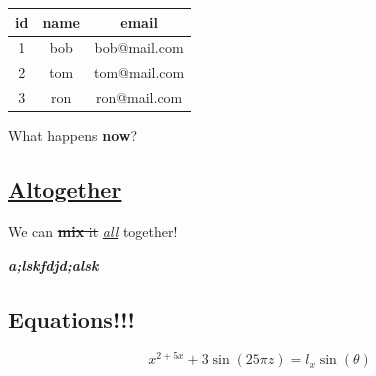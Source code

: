 \documentclass{article}
\begin{document}
\noindent
\begin{tabular}{| c | c | c |}
\hline 

id
&
name
&
email
\\
\hline 

1
&
bob
&
bob@mail.com
\\
\hline 

2
&
tom
&
tom@mail.com
\\
\hline 

3
&
ron
&
ron@mail.com
\\
\hline 
\end{tabular}


What happens \textbf{now}?

\subsection{\underline{Altogether}}

We can \sout{\textbf{mix} it}  \underline{\textit{all}} together!

\textit{\textbf{a;lskfdjd;alsk}}

\subsection{Equations!!!}

\begin{equation}
{{x^{2+{5 x}}}+{3 {\sin({25 {\pi z}})}}}={l_{x} {\sin(\theta)}}
\end{equation}
\end{document}
